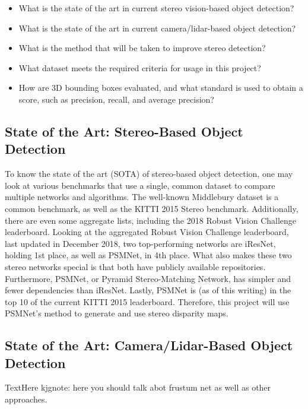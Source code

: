 \begin{itemize} \itemsep=-0.5em
\item What is the state of the art in current stereo vision-based object detection? %
\item What is the state of the art in current camera/lidar-based object detection?  %
\item What is the method that will be taken to improve stereo detection? %
\item What dataset meets the required criteria for usage in this project?			%
\item How are 3D bounding boxes evaluated, and what standard is used to obtain a score, such as precision, recall, and average precision? %
\end{itemize}

\subsection{State of the Art: Stereo-Based Object Detection}
To know the state of the art (SOTA) of stereo-based object detection, one may look at various benchmarks that use a single, common dataset to compare multiple networks and algorithms. The well-known Middlebury \cite{scharstein2014high,middlebury_leaderboard} dataset is a common benchmark, as well as the KITTI \cite{geiger_are_2012,kitti_leaderboard} 2015 Stereo benchmark. Additionally, there are even some aggregate lists, including the 2018 Robust Vision Challenge \cite{rvc_leaderboard} leaderboard. Looking at the aggregated Robust Vision Challenge leaderboard, last updated in December 2018, two top-performing networks are iResNet, holding 1st place, as well as PSMNet, in 4th place. What also makes these two stereo networks special is that both have publicly available repositories. Furthermore, PSMNet, or Pyramid Stereo-Matching Network, has simpler and fewer dependencies than iResNet. Lastly, PSMNet is (as of this writing) in the top 10 of the current KITTI 2015 leaderboard. Therefore, this project will use PSMNet's method to generate and use stereo disparity maps. 

\subsection{State of the Art: Camera/Lidar-Based Object Detection}
TextHere 
kjgnote: here you should talk abot frustum net as well as other approaches. 

